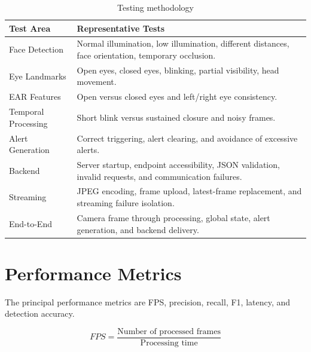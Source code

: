 \documentclass{tietreport}
\begin{document}
\begin{table}[H]
\centering
\caption{Testing methodology}
\label{tab:testing}

\begin{tabularx}{0.95\textwidth}{@{}P{3.4cm}Y@{}}

\toprule
\textbf{Test Area} & \textbf{Representative Tests}\\
\midrule

Face Detection &
Normal illumination, low illumination, different distances,
face orientation, temporary occlusion.\\

Eye Landmarks &
Open eyes, closed eyes, blinking, partial visibility, head movement.\\

EAR Features &
Open versus closed eyes and left/right eye consistency.\\

Temporal Processing &
Short blink versus sustained closure and noisy frames.\\

Alert Generation &
Correct triggering, alert clearing, and avoidance of excessive
alerts.\\

Backend &
Server startup, endpoint accessibility, JSON validation, invalid
requests, and communication failures.\\

Streaming &
JPEG encoding, frame upload, latest-frame replacement, and streaming
failure isolation.\\

End-to-End &
Camera frame through processing, global state, alert generation,
and backend delivery.\\

\bottomrule

\end{tabularx}
\end{table}


\section{Performance Metrics}

The principal performance metrics are FPS, precision, recall, F1,
latency, and detection accuracy.

\begin{equation}
FPS =
\frac{
\text{Number of processed frames}
}{
\text{Processing time}
}
\end{equation}
\end{document}
